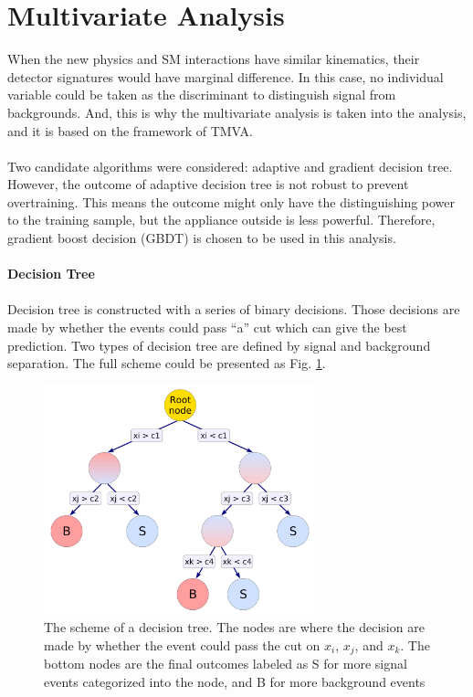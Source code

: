 \section{Multivariate Analysis}
When the new physics and SM interactions have similar kinematics, their detector signatures would have marginal difference. In this case, no individual variable could be taken as the discriminant to distinguish signal from backgrounds. And, this is why the multivariate analysis is taken into the analysis, and it is based on the framework of TMVA\cite{Hocker:2007ht}.
\\
\\Two candidate algorithms were considered: adaptive and gradient decision tree. However, the outcome of adaptive decision tree is not robust to prevent overtraining. This means the outcome might only have the distinguishing power to the training sample, but the appliance outside is less powerful. Therefore, gradient boost decision (GBDT) is chosen to be used in this analysis.
\\
\\{\bf Decision Tree}
\\
\\Decision tree is constructed with a series of binary decisions. Those decisions are made by whether the events could pass ``a'' cut which can give the best prediction. Two types of decision tree are defined by  signal and background separation. The full scheme could be presented as Fig. \ref{Fig:decision_tree}.
\begin{figure}[tbp]
	\begin{center}
		\includegraphics[width=0.7\textwidth,keepaspectratio]{Chapter5/DT.png}
		\caption{The scheme of a decision tree. The nodes are where the decision are made by whether the event could pass the cut on $x_i$, $x_j$, and $x_k$. The bottom nodes are the final outcomes labeled as S for more signal events categorized into the node, and B for more background events}
		\label{Fig:decision_tree}
	\end{center}
\end{figure} 
